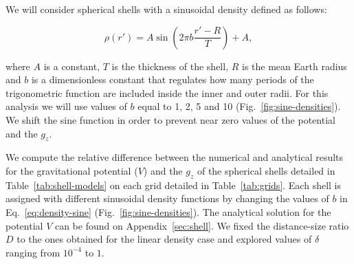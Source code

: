 \documentclass[extra, referee]{gji}
\begin{document}
We will consider spherical shells with a sinusoidal density defined as follows:

\begin{equation}
    \rho(r') = A \sin \left( 2 \pi b \frac{r' - R}{T} \right) + A,
    \label{eq:density-sine}
\end{equation}

\noindent where $A$ is a constant, $T$ is the thickness of the shell, $R$ is the mean
Earth radius and $b$ is a dimensionless constant that regulates how many periods of the
trigonometric function are included inside the inner and outer radii.
For this analysis we will use values of $b$ equal to 1, 2, 5 and 10
(Fig.~\ref{fig:sine-densities}).
We shift the sine function in order to prevent near zero values of the potential and the
$g_z$.

We compute the relative difference between the numerical and analytical results for the
gravitational potential ($V$) and the $g_z$ of the spherical shells detailed in
Table~\ref{tab:shell-models} on each grid detailed in Table~\ref{tab:grids}.
Each shell is assigned with different sinusoidal density functions by changing the
values of $b$ in Eq.~\ref{eq:density-sine} (Fig.~\ref{fig:sine-densities}).
The analytical solution for the potential $V$ can be found on Appendix~\ref{sec:shell}.
We fixed the distance-size ratio $D$ to the ones obtained for the linear density case
and explored values of $\delta$ ranging from $10^{-4}$ to $1$.
\end{document}

